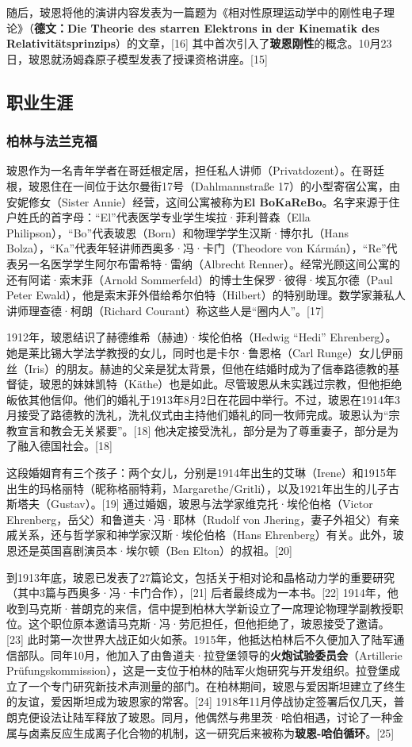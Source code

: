 随后，玻恩将他的演讲内容发表为一篇题为《相对性原理运动学中的刚性电子理论》（\textbf{德文：Die Theorie des starren Elektrons in der Kinematik des Relativitätsprinzips}）的文章，[16] 其中首次引入了\textbf{玻恩刚性}的概念。10月23日，玻恩就汤姆森原子模型发表了授课资格讲座。[15]
\subsection{职业生涯}  
\subsubsection{柏林与法兰克福}  
玻恩作为一名青年学者在哥廷根定居，担任私人讲师（Privatdozent）。在哥廷根，玻恩住在一间位于达尔曼街17号（Dahlmannstraße 17）的小型寄宿公寓，由安妮修女（Sister Annie）经营，这间公寓被称为\textbf{El BoKaReBo}。名字来源于住户姓氏的首字母：“El”代表医学专业学生埃拉·菲利普森（Ella Philipson），“Bo”代表玻恩（Born）和物理学学生汉斯·博尔扎（Hans Bolza），“Ka”代表年轻讲师西奥多·冯·卡门（Theodore von Kármán），“Re”代表另一名医学学生阿尔布雷希特·雷纳（Albrecht Renner）。经常光顾这间公寓的还有阿诺·索末菲（Arnold Sommerfeld）的博士生保罗·彼得·埃瓦尔德（Paul Peter Ewald），他是索末菲外借给希尔伯特（Hilbert）的特别助理。数学家兼私人讲师理查德·柯朗（Richard Courant）称这些人是“圈内人”。[17]  

1912年，玻恩结识了赫德维希（赫迪）·埃伦伯格（Hedwig “Hedi” Ehrenberg）。她是莱比锡大学法学教授的女儿，同时也是卡尔·鲁恩格（Carl Runge）女儿伊丽丝（Iris）的朋友。赫迪的父亲是犹太背景，但他在结婚时成为了信奉路德教的基督徒，玻恩的妹妹凯特（Käthe）也是如此。尽管玻恩从未实践过宗教，但他拒绝皈依其他信仰。他们的婚礼于1913年8月2日在花园中举行。不过，玻恩在1914年3月接受了路德教的洗礼，洗礼仪式由主持他们婚礼的同一牧师完成。玻恩认为“宗教宣言和教会无关紧要”。[18] 他决定接受洗礼，部分是为了尊重妻子，部分是为了融入德国社会。[18]  

这段婚姻育有三个孩子：两个女儿，分别是1914年出生的艾琳（Irene）和1915年出生的玛格丽特（昵称格丽特莉，Margarethe/Gritli），以及1921年出生的儿子古斯塔夫（Gustav）。[19] 通过婚姻，玻恩与法学家维克托·埃伦伯格（Victor Ehrenberg，岳父）和鲁道夫·冯·耶林（Rudolf von Jhering，妻子外祖父）有亲戚关系，还与哲学家和神学家汉斯·埃伦伯格（Hans Ehrenberg）有关。此外，玻恩还是英国喜剧演员本·埃尔顿（Ben Elton）的叔祖。[20]

到1913年底，玻恩已发表了27篇论文，包括关于相对论和晶格动力学的重要研究（其中3篇与西奥多·冯·卡门合作），[21] 后者最终成为一本书。[22] 1914年，他收到马克斯·普朗克的来信，信中提到柏林大学新设立了一席理论物理学副教授职位。这个职位原本邀请马克斯·冯·劳厄担任，但他拒绝了，玻恩接受了邀请。[23] 此时第一次世界大战正如火如荼。1915年，他抵达柏林后不久便加入了陆军通信部队。同年10月，他加入了由鲁道夫·拉登堡领导的\textbf{火炮试验委员会}（Artillerie Prüfungskommission），这是一支位于柏林的陆军火炮研究与开发组织。拉登堡成立了一个专门研究新技术声测量的部门。在柏林期间，玻恩与爱因斯坦建立了终生的友谊，爱因斯坦成为玻恩家的常客。[24] 1918年11月停战协定签署后仅几天，普朗克便设法让陆军释放了玻恩。同月，他偶然与弗里茨·哈伯相遇，讨论了一种金属与卤素反应生成离子化合物的机制，这一研究后来被称为\textbf{玻恩-哈伯循环}。[25]  

